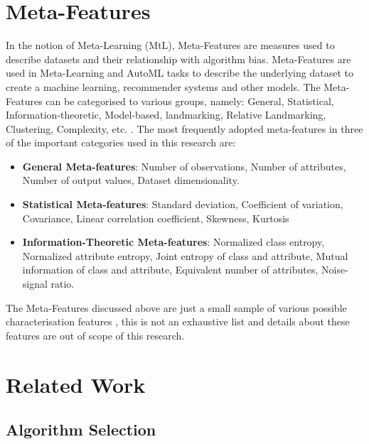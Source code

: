 \fi

\section{Meta-Features}
\label{meta-feat-realted-work}
In the notion of Meta-Learning (MtL), Meta-Features are measures used to describe datasets and their relationship with algorithm bias. Meta-Features are used in Meta-Learning and AutoML tasks to describe the underlying dataset to create a machine learning, recommender systems and other models. The Meta-Features can be categorised to various groups, namely: General, Statistical, Information-theoretic, Model-based, landmarking, Relative Landmarking, Clustering, Complexity, etc. \citep{meta-features-1} \citep{meta-features-2} \citep{meta-features-3}. The most frequently adopted meta-features in three of the important categories used in this research are:
\begin{itemize}
    \item \textbf{General Meta-features}:
    Number of observations, Number of attributes, Number of output values, Dataset dimensionality.
    
    \item \textbf{Statistical Meta-features}:
    Standard deviation, Coeﬃcient of variation, Covariance, Linear correlation coeﬃcient, Skewness, Kurtosis
    
    \item \textbf{Information-Theoretic Meta-features}:
    Normalized class entropy, Normalized attribute entropy, Joint entropy of class and attribute, Mutual information of class and attribute, Equivalent number of attributes, Noise-signal ratio.
\end{itemize}

The Meta-Features discussed above are just a small sample of various possible characterisation features \citep{meta-features-1} \citep{meta-features-2} \citep{meta-features-3} , this is not an exhaustive list and details about these features are out of scope of this research.

\section{Related Work}

\subsection*{Algorithm Selection}

